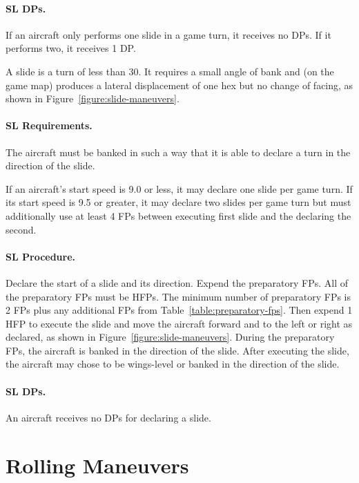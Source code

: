 {{\paragraph{SL DPs.} If an aircraft only performs one slide in a game turn, it receives no DPs. If it performs two, it receives 1 DP.

}{

A slide is a turn of less than 30{\deg}. It requires a small angle of bank and (on the game map) produces a lateral displacement of one hex but no change of facing, as shown in Figure~\ref{figure:slide-maneuvers}.

\paragraph{SL Requirements.} The aircraft must be banked in such a way that it is able to declare a turn in the direction of the slide.

If an aircraft's start speed is 9.0 or less, it may declare one slide per game turn. If its start speed is 9.5 or greater, it may declare two slides per game turn but must additionally use at least 4 FPs between executing first slide and the declaring the second.

\paragraph{SL Procedure.} Declare the start of a slide and its direction. Expend the preparatory FPs. All of the preparatory FPs must be HFPs. The minimum number of preparatory FPs is 2 FPs plus any additional FPs from Table~\ref{table:preparatory-fps}. Then expend 1 HFP to execute the slide and move the aircraft forward and to the left or right as declared, as shown in Figure~\ref{figure:slide-maneuvers}. During the preparatory FPs, the aircraft is banked in the direction of the slide. After executing the slide, the aircraft may chose to be wings-level or banked in the direction of the slide.

\paragraph{SL DPs.} An aircraft receives no DPs for declaring a slide.

}

}
\section{Rolling Maneuvers}
\label{rule:rolling-maneuvers}

